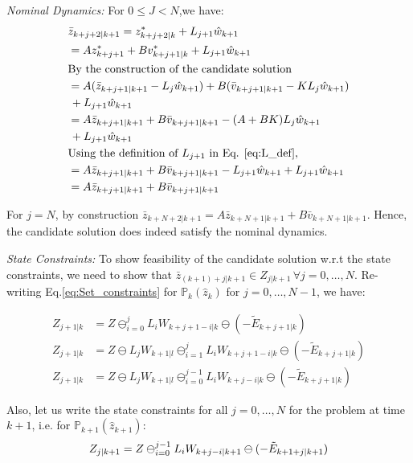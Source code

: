 \textit{ Nominal Dynamics:} For $0\leq J<N$,we have:
\begin{subequations}
\begin{align}
&\bar{z}_{k+j+2|k+1} = z^{*}_{k+j+2|k} + L_{j+1}\hat{w}_{k+1} \\
&= Az^{*}_{k+j+1}+Bv^{*}_{k+j+1|k} + L_{j+1}\hat{w}_{k+1} \\
& \text{By the construction of the candidate solution} \nonumber \\
& = A(\bar{z}_{k+j+1|k+1}-L_j\hat{w}_{k+1}) + B(\bar{v}_{k+j+1|k+1} - KL_j \hat{w}_{k+1}) \nonumber \\
&\, + L_{j+1}\hat{w}_{k+1} \\
& = A\bar{z}_{k+j+1|k+1} + B\bar{v}_{k+j+1|k+1} -(A+BK)L_j\hat{w}_{k+1} \nonumber \\
&\,+ L_{j+1}\hat{w}_{k+1} \\
&\text{Using the definition of $L_{j+1}$ in Eq. \ref{eq:L_def},} \nonumber \\
& = A\bar{z}_{k+j+1|k+1} + B\bar{v}_{k+j+1|k+1} - L_{j+1}\hat{w}_{k+1} + L_{j+1}\hat{w}_{k+1} \\
& = A\bar{z}_{k+j+1|k+1} + B\bar{v}_{k+j+1|k+1}
\end{align}
\end{subequations}

For $j=N$, by construction $\bar{z}_{k+N+2|k+1} = A\bar{z}_{k+N+1|k+1} + B\bar{v}_{k+N+1|k+1}$. Hence, the candidate solution does indeed satisfy the nominal dynamics.

\textit{State Constraints:} To show feasibility of the candidate solution w.r.t the state constraints, we need to show that $\bar{z}_{(k+1)+j|k+1}\in Z_{j|k+1}\, \forall j=0,\dotsc,N$. Re-writing Eq.\ref{eq:Set_constraints} for $\mathbb{P}_{k}(\hat{z}_k)$ for $j=0,\dotsc,N-1$, we have:

\begin{subequations}
\label{eq:redef_Zj}
\begin{align}
Z_{j+1|k} &= Z \ominus_{i=0}^{j}L_iW_{k+j+1-i|k} \ominus (-\tilde{E}_{k+j+1|k}) \\
Z_{j+1|k} &= Z \ominus L_jW_{k+1|l} \ominus_{i=1}^{j}L_iW_{k+j+1-i|k} \ominus (-\tilde{E}_{k+j+1|k})\\
Z_{j+1|k} &= Z \ominus L_jW_{k+1|l} \ominus_{i=0}^{j-1}L_iW_{k+j-i|k} \ominus (-\tilde{E}_{k+j+1|k})
\end{align}
\end{subequations}

Also, let us write the state constraints for all $j=0,\dotsc,N$ for the problem at time $k+1$, i.e. for $\mathbb{P}_{k+1}(\hat{z}_{k+1})$:
\begin{equation}
\label{eq:redef_Zjp1}
Z_{j|k+1} = Z \ominus_{i=0}^{j-1}L_iW_{k+j-i|k+1} \ominus (-\tilde{E}_{k+1+j|k+1}) \\
\end{equation}

